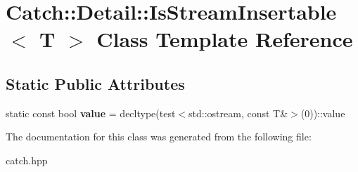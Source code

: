 \hypertarget{classCatch_1_1Detail_1_1IsStreamInsertable}{}\section{Catch\+:\+:Detail\+:\+:Is\+Stream\+Insertable$<$ T $>$ Class Template Reference}
\label{classCatch_1_1Detail_1_1IsStreamInsertable}
\subsection*{Static Public Attributes}
\begin{DoxyCompactItemize}
\item 
static const bool {\bfseries value} = decltype(test$<$std\+::ostream, const T\&$>$(0))\+::value\hypertarget{classCatch_1_1Detail_1_1IsStreamInsertable_a42818b09ae5851126a70ee263769e309}{}\label{classCatch_1_1Detail_1_1IsStreamInsertable_a42818b09ae5851126a70ee263769e309}

\end{DoxyCompactItemize}


The documentation for this class was generated from the following file\+:\begin{DoxyCompactItemize}
\item 
catch.\+hpp\end{DoxyCompactItemize}
